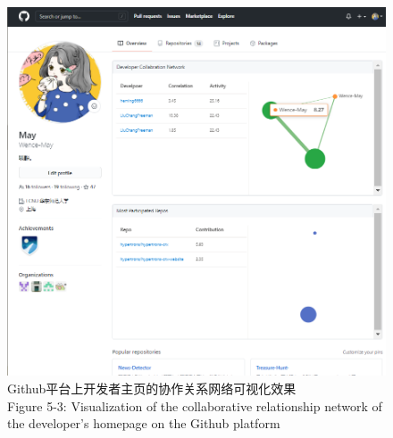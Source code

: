 \begin{figure}[H]
    \centering
    \includegraphics[width=130mm]{./figures/个人主页.png}
    \caption{Github平台上开发者主页的协作关系网络可视化效果\\Figure 5-3: Visualization of the collaborative relationship network of the developer's homepage on the Github platform}
\end{figure}

